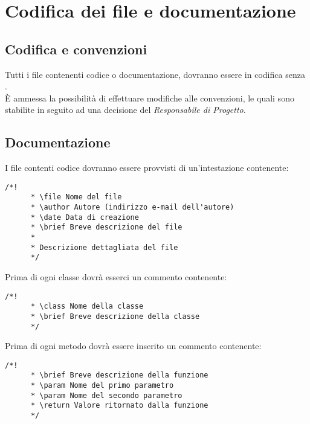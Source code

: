 \section{Codifica dei file e documentazione}
  \subsection{Codifica e convenzioni}
  Tutti i file contenenti codice o documentazione, dovranno essere in codifica  senza .\\
  È ammessa la possibilità di effettuare modifiche alle convenzioni, le quali sono stabilite in seguito ad una decisione del \emph{Responsabile di Progetto}.\\

  \subsection{Documentazione}
    I file contenti codice dovranno essere provvisti di un'intestazione contenente:
    \begin{lstlisting}[frame=single]
      /*!
      * \file Nome del file
      * \author Autore (indirizzo e-mail dell'autore)
      * \date Data di creazione
      * \brief Breve descrizione del file
      *
      * Descrizione dettagliata del file
      */
    \end{lstlisting}
    Prima di ogni classe dovrà esserci un commento contenente:
    \begin{lstlisting}[frame=single]
      /*!
      * \class Nome della classe
      * \brief Breve descrizione della classe
      */
    \end{lstlisting}
    Prima di ogni metodo dovrà essere inserito un commento contenente:
    \begin{lstlisting}[frame=single]
      /*!
      * \brief Breve descrizione della funzione
      * \param Nome del primo parametro
      * \param Nome del secondo parametro
      * \return Valore ritornato dalla funzione
      */
    \end{lstlisting}
